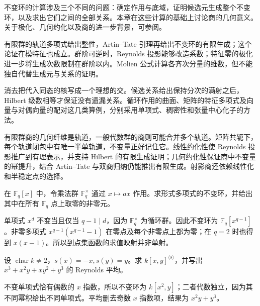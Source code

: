\ProseParagraphBreak
不变环的计算涉及三个不同的问题：确定作用与底域，证明候选元生成整个不变环，以及求出它们之间的全部关系。本章在这些计算的基础上讨论商的几何意义。关于极化、几何约化以及商的进一步背景，可参阅\cite[Sections 1.2, 3.4 and 6.1; Chapters 7--9]{Dolgachev2003InvariantTheory}。









\begin{chaptersummary}
	有限群的轨道多项式给出整性，Artin--Tate 引理再给出不变环的有限生成；这个论证在模特征也成立。群阶可逆时，Reynolds 投影能够改造系数；特征零的极化进一步将生成次数限制在群阶以内。Molien 公式计算各齐次分量的维数，但不能独自代替生成元与关系的证明。

	\ProseParagraphBreak
	消去把代入同态的核写成一个理想的交。候选关系给出保持分次的满射之后，Hilbert 级数相等才保证没有遗漏关系。循环作用的曲面、矩阵的特征多项式及向量与对偶向量的配对这几类算例，分别采用单项式、稠密性和张量中心化子的方法。

	\ProseParagraphBreak
	有限群商的几何纤维是轨道，一般代数群的商则可能合并多个轨道。矩阵共轭下，每个轨道闭包中有唯一半单轨道，不变量正好记住它。线性约化性使 Reynolds 投影推广到有理表示，并支持 Hilbert 的有限生成证明；几何约化性保证商中不变量的幂提升，结合 Artin--Tate 与双商归纳仍能推出有限生成。射影商还依赖线性化和半稳定点的选择。
\end{chaptersummary}

\BookExercises

\begin{optionalexercise}\label{b5:ex:22-coordinate-versus-points}
	在 \(\mathbb F_q[x]\) 中，令乘法群 \(\mathbb F_q^\times\) 通过 \(x\mapsto ax\) 作用。求形式多项式的不变环，并给出其中在所有 \(\mathbb F_q\) 点上取零的非零元。
\end{optionalexercise}
\begin{solution}
	单项式 \(x^d\) 不变当且仅当 \(q-1\mid d\)，因为 \(\mathbb F_q^\times\) 为循环群。因此不变环为 \(\mathbb F_q[x^{q-1}]\)。非零多项式 \(x^{q-1}(x^{q-1}-1)\) 在零点及每个非零点上都为零；在 \(q=2\) 时也得到 \(x(x-1)\)。所以到点集函数的求值映射并非单射。
\end{solution}

\begin{optionalexercise}\label{b5:ex:22-sign-one-coordinate}
	设 \(\operatorname{char}k\ne2\)，\(s(x)=-x,s(y)=y\)。求 \(k[x,y]^{\langle s\rangle}\)，并写出 \(x^3+x^2y+xy^2+y^3\) 的 Reynolds 平均。
\end{optionalexercise}
\begin{solution}
	不变单项式恰有偶数的 \(x\) 指数，所以不变环为 \(k[x^2,y]\)；二者代数独立，因为其不同幂积给出不同单项式。平均删去奇数 \(x\) 指数项，结果为 \(x^2y+y^3\)。
\end{solution}

